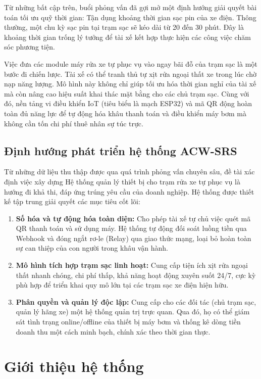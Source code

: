 \documentclass[../main.tex]{subfiles}
\begin{document}
Từ những bất cập trên, buổi phỏng vấn đã gợi mở một định hướng giải quyết bài toán tối ưu quỹ thời gian: Tận dụng khoảng thời gian sạc pin của xe điện. Thông thường, một chu kỳ sạc pin tại trạm sạc sẽ kéo dài từ 20 đến 30 phút. Đây là khoảng thời gian trống lý tưởng để tài xế kết hợp thực hiện các công việc chăm sóc phương tiện.

Việc đưa các module máy rửa xe tự phục vụ vào ngay bãi đỗ của trạm sạc là một bước đi chiến lược. Tài xế có thể tranh thủ tự xịt rửa ngoại thất xe trong lúc chờ nạp năng lượng. Mô hình này không chỉ giúp tối ưu hóa thời gian nghỉ của tài xế mà còn nâng cao hiệu suất khai thác mặt bằng cho các chủ trạm sạc. Cùng với đó, nền tảng vi điều khiển IoT (tiêu biểu là mạch ESP32) và mã QR động hoàn toàn đủ năng lực để tự động hóa khâu thanh toán và điều khiển máy bơm mà không cần tốn chi phí thuê nhân sự túc trực.

\subsection{Định hướng phát triển hệ thống ACW-SRS}

Từ những dữ liệu thu thập được qua quá trình phỏng vấn chuyên sâu, đề tài xác định việc xây dựng Hệ thống quản lý thiết bị cho trạm rửa xe tự phục vụ là hướng đi khả thi, đáp ứng trúng yêu cầu của doanh nghiệp. Hệ thống được thiết kế tập trung giải quyết các mục tiêu cốt lõi:
\begin{enumerate}
    \item \textbf{Số hóa và tự động hóa toàn diện:} Cho phép tài xế tự chủ việc quét mã QR thanh toán và sử dụng máy. Hệ thống tự động đối soát luồng tiền qua Webhook và đóng ngắt rơ-le (Relay) qua giao thức mạng, loại bỏ hoàn toàn sự can thiệp của con người trong khâu vận hành.
    \item \textbf{Mô hình tích hợp trạm sạc linh hoạt:} Cung cấp tiện ích xịt rửa ngoại thất nhanh chóng, chi phí thấp, khả năng hoạt động xuyên suốt 24/7, cực kỳ phù hợp để triển khai quy mô lớn tại các trạm sạc xe điện hiện hữu.
    \item \textbf{Phân quyền và quản lý độc lập:} Cung cấp cho các đối tác (chủ trạm sạc, quản lý hãng xe) một hệ thống quản trị trực quan. Qua đó, họ có thể giám sát tình trạng online/offline của thiết bị máy bơm và thống kê dòng tiền doanh thu một cách minh bạch, chính xác theo thời gian thực.
\end{enumerate}

\section{Giới thiệu hệ thống}
\end{document}
